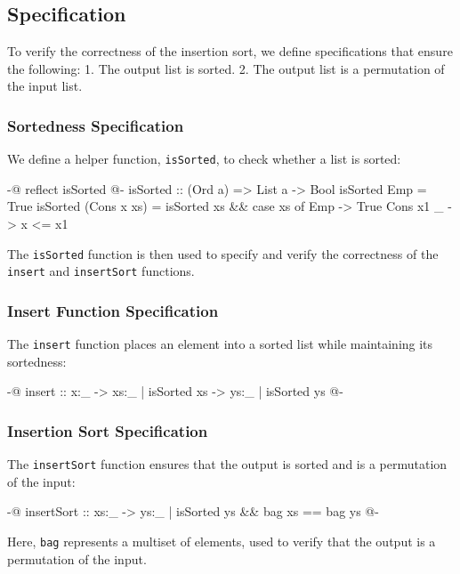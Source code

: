\documentclass[]{rptuseminar}
\begin{document}
\subsection{Specification}

To verify the correctness of the insertion sort, we define specifications that ensure the following:
1. The output list is sorted.
2. The output list is a permutation of the input list.

\subsubsection{Sortedness Specification}

We define a helper function, \texttt{isSorted}, to check whether a list is sorted:

\begin{haskell}
{-@ reflect isSorted @-}
isSorted :: (Ord a) => List a -> Bool
isSorted Emp = True
isSorted (Cons x xs) =
  isSorted xs && case xs of
    Emp        -> True
    Cons x1 _  -> x <= x1
\end{haskell}

The \texttt{isSorted} function is then used to specify and verify the correctness of the \texttt{insert} and \texttt{insertSort} functions.

\subsubsection{Insert Function Specification}

The \texttt{insert} function places an element into a sorted list while maintaining its sortedness:

\begin{haskell}
{-@ insert :: x:_ -> {xs:_ | isSorted xs} -> {ys:_ | isSorted ys} @-}
\end{haskell}

\subsubsection{Insertion Sort Specification}

The \texttt{insertSort} function ensures that the output is sorted and is a permutation of the input:

\begin{haskell}
{-@ insertSort :: xs:_ -> {ys:_ | isSorted ys && bag xs == bag ys} @-}
\end{haskell}

Here, \texttt{bag} represents a multiset of elements, used to verify that the output is a permutation of the input.
\end{document}
